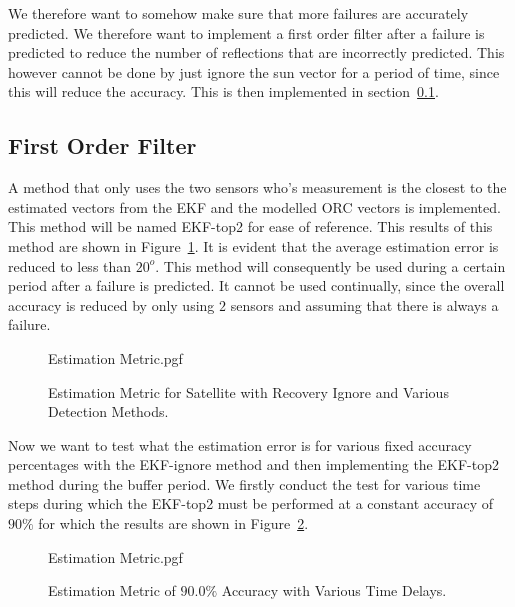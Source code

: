 \documentclass[letterpaper, 10 pt, conference]{ieeeconf}  %
\begin{document}
We therefore want to somehow make sure that more failures are accurately predicted. We therefore want to implement a first order filter after a failure is predicted to reduce the number of reflections that are incorrectly predicted. This however cannot be done by just ignore the sun vector for a period of time, since this will reduce the accuracy. This is then implemented in section~\ref{section:First Order Filter}.

\subsection{First Order Filter}
\label{section:First Order Filter}
A method that only uses the two sensors who's measurement is the closest to the estimated vectors from the EKF and the modelled ORC vectors is implemented. This method will be named EKF-top2 for ease of reference. This results of this method are shown in Figure~\ref{fig:Estimation Accuracy EKF-top2 summary}. It is evident that the average estimation error is reduced to less than $20^o$. This method will consequently be used during a certain period after a failure is predicted. It cannot be used continually, since the overall accuracy is reduced by only using $2$ sensors and assuming that there is always a failure.

\begin{figure}[!htb]
	\begin{center}
		{Estimation Metric.pgf}
	\end{center}
	\caption[Estimation Metric for Satellite with Recovery Ignore and Various detection Methods]{Estimation Metric for Satellite with Recovery Ignore and Various Detection Methods.}
	\label{fig:Estimation Accuracy EKF-top2 summary}
\end{figure}

Now we want to test what the estimation error is for various fixed accuracy percentages with the EKF-ignore method and then implementing the EKF-top2 method during the buffer period. We firstly conduct the test for various time steps during which the EKF-top2 must be performed at a constant accuracy of $90\%$ for which the results are shown in Figure~\ref{fig:Prediction Accuracy 90.0 with various steps summary}. 

\begin{figure}[!htb]
	\begin{center}
		{Estimation Metric.pgf}
	\end{center}
	\caption[Estimation Metric of $90.0\%$ Accuracy with Various Time Delays]{Estimation Metric of $90.0\%$ Accuracy with Various Time Delays.}
	\label{fig:Prediction Accuracy 90.0 with various steps summary}
\end{figure}
\end{document}
